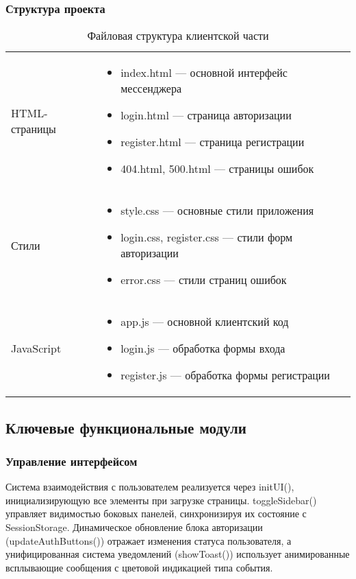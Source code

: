 \subsubsection{Структура проекта}
\begin{xltabular}{\textwidth}{|l|X|}
	\caption{Файловая структура клиентской части}\label{tab:project-structure} \\ \hline
	 &  \\ \hline 
	\endfirsthead
	\finishhead
	HTML-страницы & 
	\begin{itemize}[leftmargin=*,nosep]
		\item index.html — основной интерфейс мессенджера
		\item login.html — страница авторизации
		\item register.html — страница регистрации
		\item 404.html, 500.html — страницы ошибок
	\end{itemize} \\ \hline
	
	Стили & 
	\begin{itemize}[leftmargin=*,nosep]
		\item style.css — основные стили приложения
		\item login.css, register.css — стили форм авторизации
		\item error.css — стили страниц ошибок
	\end{itemize} \\ \hline
	
	JavaScript & 
	\begin{itemize}[leftmargin=*,nosep]
		\item app.js — основной клиентский код 
		\item login.js — обработка формы входа
		\item register.js — обработка формы регистрации
	\end{itemize} \\ \hline
	
\end{xltabular}

\subsection{Ключевые функциональные модули}

\subsubsection{Управление интерфейсом}
Система взаимодействия с пользователем реализуется через initUI(), инициализирующую все элементы при загрузке страницы. toggleSidebar() управляет видимостью боковых панелей, синхронизируя их состояние с SessionStorage. Динамическое обновление блока авторизации (updateAuthButtons()) отражает изменения статуса пользователя, а унифицированная система уведомлений (showToast()) использует анимированные всплывающие сообщения с цветовой индикацией типа события.

